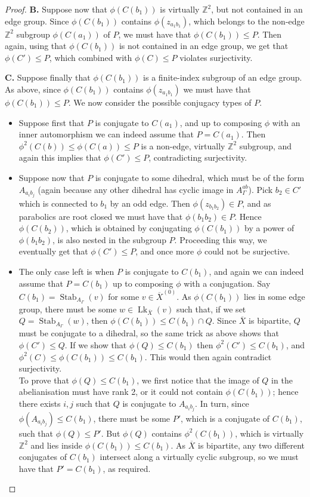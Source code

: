 \documentclass[svgnames]{amsart}
\theoremstyle{plain}
\theoremstyle{definition}
\newcommand{\Z}{\mathbb{Z}}
\newcommand{\ov}[1]{\overline{#1}}
\newcommand{\link}{\operatorname{Lk}}
\newcommand{\Stab}[2]{\operatorname{Stab}_{#1}(#2)}
\begin{document}
\begin{proof}
\par\medskip
    \textbf{B.}
    Suppose now that $\phi(C(b_1))$ is virtually $\Z^2$, but not contained in an edge group. Since $\phi(C(b_1))$ contains $\phi(z_{a_1b_1})$, which belongs to the non-edge $\Z^2$ subgroup $\phi(C(a_1))$ of $P$, we must have that $\phi(C(b_1))\le P$. Then again, using that $\phi(C(b_1))$ is not contained in an edge group, we get that $\phi(C')\le P$, which combined with $\phi(C)\le P$ violates surjectivity.
    \par\medskip
    \textbf{C.}
    Suppose finally that $\phi(C(b_1))$ is a finite-index subgroup of an edge group. As above, since $\phi(C(b_1))$ contains $\phi(z_{a_1b_1})$ we must have that $\phi(C(b_1))\le P$. We now consider the possible conjugacy types of $P$.
    \begin{itemize}
        \item Suppose first that $P$ is conjugate to $C(a_1)$, and up to composing $\phi$ with an inner automorphism we can indeed assume that $P=C(a_1)$. Then $\phi^2(C(b))\le \phi(C(a))\le P$ is a non-edge, virtually $\Z^2$ subgroup, and again this implies that $\phi(C')\le P$, contradicting surjectivity.
        \item Suppose now that $P$ is conjugate to some dihedral, which must be of the form $A_{a_ib_j}$ (again because any other dihedral has cyclic image in $A_\Gamma^{ab}$). Pick $b_2\in C'$ which is connected to $b_1$ by an odd edge. Then $\phi(z_{b_1b_2})\in P$, and as parabolics are root closed we must have that $\phi(b_1b_2)\in P$. Hence $\phi(C(b_2))$, which is obtained by conjugating $\phi(C(b_1))$ by a power of $\phi(b_1b_2)$, is also nested in the subgroup $P$. Proceeding this way, we eventually get that $\phi(C')\le P$, and once more $\phi$ could not be surjective. 
        \item The only case left is when $P$ is conjugate to $C(b_1)$, and again we can indeed assume that $P=C(b_1)$ up to composing $\phi$ with a conjugation. Say $C(b_1)=\Stab{A_\Gamma}{v}$ for some $v\in \ov X^{(0)}$. As $\phi(C(b_1))$ lies in some edge group, there must be some $w\in\link_{\ov X}(v)$ such that, if we set $Q=\Stab{A_\Gamma}{w}$, then $\phi(C(b_1))\le C(b_1)\cap Q$. Since $\ov X$ is bipartite, $Q$ must be conjugate to a dihedral, so the same trick as above shows that $\phi(C')\le Q$. If we show that $\phi(Q)\le C(b_1)$ then $\phi^2(C')\le C(b_1)$, and $\phi^2(C)\le \phi(C(b_1))\le C(b_1)$. This would then again contradict surjectivity. 
        \\
        To prove that $\phi(Q)\le C(b_1)$, we first notice that the image of $Q$ in the abelianisation must have rank 2, or it could not contain $\phi(C(b_1))$; hence there exists $i,j$ such that $Q$ is conjugate to $A_{a_ib_j}$. In turn, since $\phi(A_{a_ib_j})\le C(b_1)$, there must be some $P'$, which is a conjugate of $C(b_1)$, such that $\phi(Q)\le P'$. But $\phi(Q)$ contains $\phi^2(C(b_1))$, which is virtually $\Z^2$ and lies inside $\phi(C(b_1))\le C(b_1)$. As $\ov X$ is bipartite, any two different conjugates of $C(b_1)$ intersect along a virtually cyclic subgroup, so we must have that $P'=C(b_1)$, as required.

\end{itemize}
\end{proof}
\end{document}

